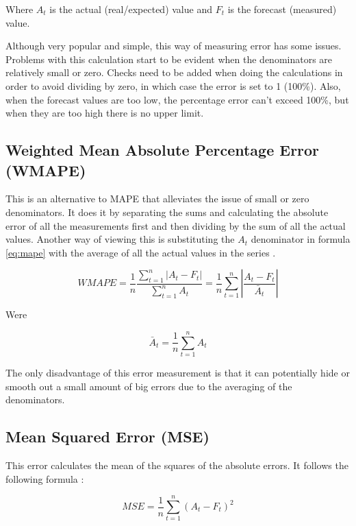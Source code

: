Where $A_t$ is the actual (real/expected) value and $F_t$ is the forecast (measured) value.

Although very popular and simple, this way of measuring error has some issues. Problems with this calculation start to be evident when the denominators are relatively small or zero. Checks need to be added when doing the calculations in order to avoid dividing by zero, in which case the error is set to 1 (100\%). Also, when the forecast values are too low, the percentage error can't exceed 100\%, but when they are too high there is no upper limit.

\subsection{Weighted Mean Absolute Percentage Error (WMAPE)}

This is an alternative to MAPE that alleviates the issue of small or zero denominators. It does it by separating the sums and calculating the absolute error of all the measurements first and then dividing by the sum of all the actual values. Another way of viewing this is substituting the $A_t$ denominator in formula \ref{eq:mape} with the average of all the actual values in the series \cite{wmape}.

\begin{equation}\label{eq:wmape}
WMAPE=\frac{1}{n}\frac{\sum_{t=1}^{n}\left| A_{t}-F_{t} \right|}{\sum_{t=1}^{n}A_{t}}=\frac{1}{n}\sum_{t=1}^{n}\left| \frac{A_{t}-F_{t}}{\bar{A}_{t}} \right|
\end{equation}

Were

\begin{equation}\label{eq:actual_vals_average}
\bar{A}_{t}=\frac{1}{n}\sum_{t=1}^{n}A_{t}
\end{equation}

The only disadvantage of this error measurement is that it can potentially hide or smooth out a small amount of big errors due to the averaging of the denominators.

\subsection{Mean Squared Error (MSE)}

This error calculates the mean of the squares of the absolute errors. It follows the following formula \cite{mse}:

\begin{equation}\label{eq:mse}
MSE=\frac{1}{n}\sum_{t=1}^{n}\left( A_{t}-F_{t} \right)^{2}
\end{equation}

